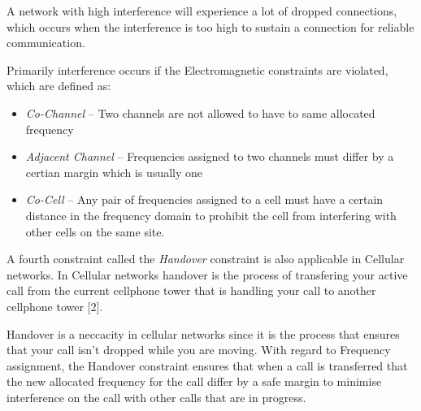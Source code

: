 \documentclass[portrait, a0]{a0poster}
\begin{document}
\begin{textblock}{8}
A network with high interference will experience a lot of dropped connections, which occurs when the interference is too high to sustain a connection for reliable communication.

Primarily interference occurs if the Electromagnetic constraints are violated, which are defined as:
\begin{itemize}
\item \textsl{Co-Channel} -- Two channels are not allowed to have to same allocated frequency
\item \textsl{Adjacent Channel} -- Frequencies assigned to two channels must differ by a certian margin which is usually one
\item \textsl{Co-Cell} -- Any pair of frequencies assigned to a cell must have a certain distance in the frequency domain to prohibit the cell from interfering with other cells on the same site.
\end{itemize}

A fourth constraint called the \emph{Handover} constraint is also applicable in Cellular networks. In Cellular networks handover is the process of transfering your active call from the current cellphone tower that is handling your call to another cellphone tower {[2]}.

Handover is a neccacity in cellular networks since it is the process that ensures that your call isn't dropped while you are moving. With regard to Frequency assignment, the Handover constraint ensures that when a call is transferred that the new allocated frequency for the call differ by a safe margin to minimise interference on the call with other calls that are in progress.


\end{textblock}
\end{document}
